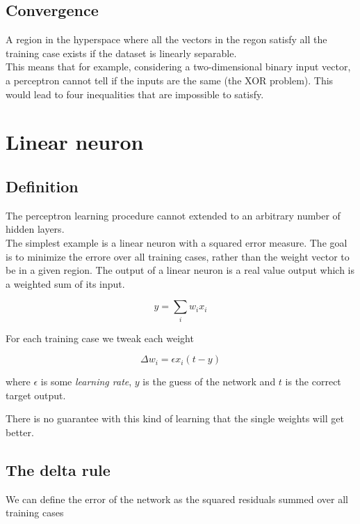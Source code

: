 \documentclass{article}
\begin{document}

\subsection{Convergence}

A region in the hyperspace where all the vectors in the regon satisfy all the training case exists if the dataset is linearly separable.
\\
This means that for example, considering a two-dimensional binary input vector, a perceptron cannot tell if the inputs are the same
(the XOR problem). This would lead to four inequalities that are impossible to satisfy.

\pagebreak


\section{Linear neuron}

\subsection{Definition}

The perceptron learning procedure cannot extended to an arbitrary number of hidden layers. \\

The simplest example is a linear neuron with a squared error measure.
The goal is to minimize the errore over all training cases, rather than the weight vector to be in a given region.
The output of a linear neuron is a real value output which is a weighted sum of its input.

\[
    y=\sum_i w_i x_i
\]

For each training case we tweak each weight

\[
    \Delta w_i=\epsilon x_i(t-y)
\]

where \(\epsilon\) is some \textit{learning rate}, \(y\) is the guess of the network and \(t\) is the correct target output.

There is no guarantee with this kind of learning that the single weights will get better.

\subsection{The delta rule}

We can define the error of the network as the squared residuals summed over all training cases
\end{document}
